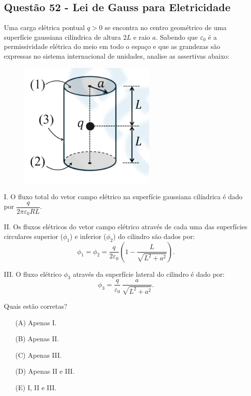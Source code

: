 \documentclass[a4paper,12pt]{article}
\begin{document}
\begin{flushleft}
\subsection{Quest\~ao 52 - Lei de Gauss para Eletricidade}

Uma carga elétrica pontual \(q>0\) se encontra no centro geométrico de uma superfície gaussiana cilíndrica de altura 
\(2L\) e raio \(a\). Sabendo que \(\varepsilon_0\) é a permissividade elétrica do meio em todo o espaço e que as grandezas 
são expressas no sistema internacional de unidades, analise as assertivas abaixo:

\begin{figure}[!h]
  \centering
  \includegraphics[scale=0.6]{figures/lei_de_gauss.png}
\end{figure}

I. O fluxo total do vetor campo elétrico na superfície gaussiana cilíndrica é dado por \(\dfrac{q}{2\pi\varepsilon_0RL}\).

II. Os fluxos elétricos do vetor campo elétrico através de cada uma das superfícies circulares superior (\(\phi_1\)) e inferior (\(\phi_2\)) do cilindro são dados por:
\[
\phi_1=\phi_2=\frac{q}{2\varepsilon_0}\left(1-\frac{L}{\sqrt{L^2+a^2}}\right).
\]

III. O fluxo elétrico \(\phi_3\) através da superfície lateral do cilindro é dado por:
\[
\phi_3=\frac{q}{\varepsilon_0}\,\frac{a}{\sqrt{L^2+a^2}}.
\]

Quais estão corretas?

\begin{itemize}
\item[(A)] Apenas I.
\item[(B)] Apenas II.
\item[(C)] Apenas III.
\item[(D)] Apenas II e III.
\item[(E)] I, II e III.
\end{itemize}


\end{flushleft}
\end{document}
